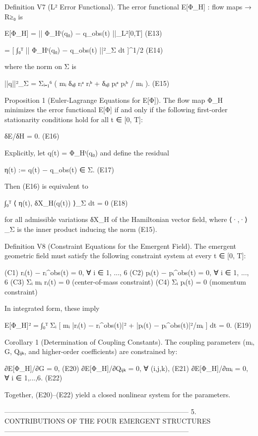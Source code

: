 Definition V7 (L² Error Functional).
The error functional E[Φ_H] : {flow maps} → R≥₀ is

    E[Φ_H] = || Φ_Hᵗ(q₀) − q_obs(t) ||_{L²[0,T]}     (E13)

    = [ ∫₀ᵀ || Φ_Hᵗ(q₀) − q_obs(t) ||²_Σ dt ]^{1/2}   (E14)

where the norm on Σ is

    ||q||²_Σ = Σᵢ₌₁⁶ ( mᵢ δₐᵦ rᵢᵃ rᵢᵇ + δₐᵦ pᵢᵃ pᵢᵇ / mᵢ ).   (E15)


Proposition 1 (Euler-Lagrange Equations for E[Φ]).
The flow map Φ_H minimizes the error functional E[Φ] if and only if the
following first-order stationarity conditions hold for all t ∈ [0, T]:

    δE/δH = 0.                                     (E16)

Explicitly, let q(t) = Φ_Hᵗ(q₀) and define the residual

    η(t) := q(t) − q_obs(t) ∈ Σ.                   (E17)

Then (E16) is equivalent to

    ∫₀ᵀ ⟨ η(t),  δX_H(q(t)) ⟩_Σ dt = 0            (E18)

for all admissible variations δX_H of the Hamiltonian vector field, where
⟨·,·⟩_Σ is the inner product inducing the norm (E15).


Definition V8 (Constraint Equations for the Emergent Field).
The emergent geometric field must satisfy the following constraint system
at every t ∈ [0, T]:

(C1)   rᵢ(t) − rᵢ^{obs}(t) = 0,        ∀ i ∈ {1, ..., 6}
(C2)   pᵢ(t) − pᵢ^{obs}(t) = 0,        ∀ i ∈ {1, ..., 6}
(C3)   Σᵢ mᵢ rᵢ(t) = 0                 (center-of-mass constraint)
(C4)   Σᵢ pᵢ(t) = 0                    (momentum constraint)

In integrated form, these imply

    E[Φ_H]² = ∫₀ᵀ Σᵢ [ mᵢ |rᵢ(t) − rᵢ^{obs}(t)|² + |pᵢ(t) − pᵢ^{obs}(t)|²/mᵢ ] dt = 0.   (E19)


Corollary 1 (Determination of Coupling Constants).
The coupling parameters (mᵢ, G, Qᵢⱼₖ, and higher-order coefficients) are
constrained by:

    ∂E[Φ_H]/∂G = 0,                                (E20)
    ∂E[Φ_H]/∂Qᵢⱼₖ = 0,      ∀ (i,j,k),            (E21)
    ∂E[Φ_H]/∂mᵢ = 0,        ∀ i ∈ {1,...,6}.       (E22)

Together, (E20)–(E22) yield a closed nonlinear system for the parameters.


--------------------------------------------------------------------------------
5. CONTRIBUTIONS OF THE FOUR EMERGENT STRUCTURES
--------------------------------------------------------------------------------


